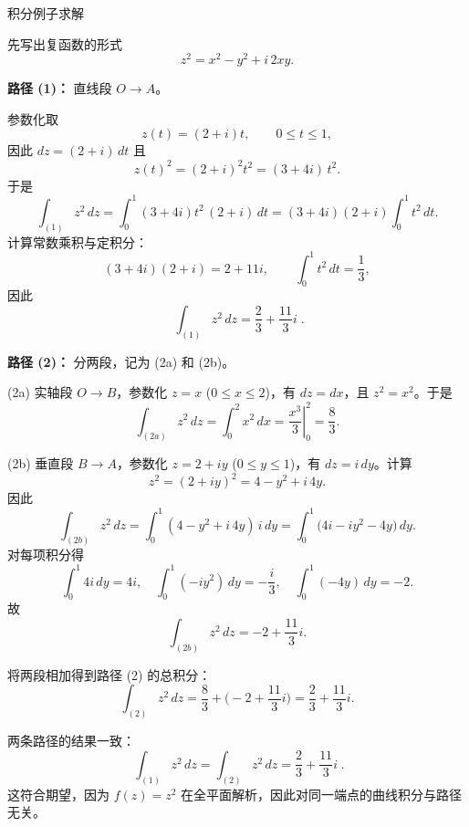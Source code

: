 \documentclass[fontset=windows, chinese, 10pt]{beamer}
\begin{document}
\begin{frame}{积分例子求解}
\small
\begin{solution}
  \small
先写出复函数的形式
\[
z^2 = x^2 - y^2 + i\,2xy.
\]

\textbf{路径 (1)：} 直线段 \(O\to A\)。

参数化取
\[
z(t)=(2+i)t,\qquad 0\le t\le 1,
\]
因此 \(dz=(2+i)\,dt\) 且
\[
z(t)^2=(2+i)^2 t^2=(3+4i)\,t^2.
\]
于是
\[
\int_{(1)} z^2\,dz
=\int_{0}^{1} (3+4i)t^2\,(2+i)\,dt
=(3+4i)(2+i)\int_{0}^{1} t^2\,dt.
\]
计算常数乘积与定积分：
\[
(3+4i)(2+i)=2+11i,\qquad \int_0^1 t^2\,dt=\frac{1}{3},
\]
因此
\[
\boxed{\;\int_{(1)} z^2\,dz=\frac{2}{3}+\frac{11}{3}i\;.}
\]
\end{solution}
\end{frame}

\begin{frame}
\begin{solution}
  \small

\textbf{路径 (2)：} 分两段，记为 (2a) 和 (2b)。

(2a) 实轴段 \(O\to B\)，参数化 \(z=x\) (\(0\le x\le 2\))，有 \(dz=dx\)，且 \(z^2=x^2\)。于是
\[
\int_{(2a)} z^2\,dz=\int_{0}^{2} x^2\,dx=\left.\frac{x^3}{3}\right|_{0}^{2}=\frac{8}{3}.
\]

(2b) 垂直段 \(B\to A\)，参数化 \(z=2+i y\) (\(0\le y\le 1\))，有 \(dz=i\,dy\)。计算
\[
z^2=(2+i y)^2=4- y^2 + i\,4y.
\]
因此
\[
\int_{(2b)} z^2\,dz
=\int_{0}^{1} (4- y^2 + i\,4y)\,i\,dy
=\int_{0}^{1}\big(4i - i y^2 -4y\big)\,dy.
\]
对每项积分得
\[
\int_0^1 4i\,dy = 4i,\quad
\int_0^1 (-i y^2)\,dy = -\frac{i}{3},\quad
\int_0^1 (-4y)\,dy = -2.
\]
故
\[
\int_{(2b)} z^2\,dz = -2 + \frac{11}{3}i.
\]
\end{solution}
\end{frame}

\begin{frame}
  \small
  \begin{solution}
将两段相加得到路径 (2) 的总积分：
\[
\int_{(2)} z^2\,dz
= \frac{8}{3} + \Big(-2 + \frac{11}{3}i\Big)
= \frac{2}{3} + \frac{11}{3}i.
\]

两条路径的结果一致：
\[
\boxed{\;\int_{(1)} z^2\,dz=\int_{(2)} z^2\,dz=\frac{2}{3}+\frac{11}{3}i\;.}
\]
这符合期望，因为 \(f(z)=z^2\) 在全平面解析，因此对同一端点的曲线积分与路径无关。

\end{solution}
\end{frame}


\end{document}
